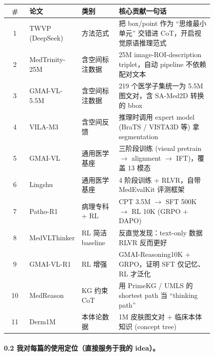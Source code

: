 \begin{center}
\renewcommand{\arraystretch}{1.3}
\setlength{\tabcolsep}{4pt}
\footnotesize
\begin{tabular}{|c|p{0.20\linewidth}|p{0.18\linewidth}|p{0.46\linewidth}|}
\hline
\# & 论文 & 类别 & 核心贡献一句话 \\
\hline
1 & TWVP (DeepSeek) & 方法范式 & 把 box/point 作为 ``思维最小单元'' 交错进 CoT，开启视觉原语推理范式 \\
\hline
2 & MedTrinity-25M & 含空间标注数据 & 25M image-ROI-description triplet，自动 pipeline 不依赖配对文本 \\
\hline
3 & GMAI-VL-5.5M & 含空间标注数据 & 219 个医学子集统一为 5.5M 图文对，含 SA-Med2D 转换的 bbox \\
\hline
4 & VILA-M3 & 含空间反馈 & 推理时调用 expert model (BraTS / VISTA3D 等) 拿 segmentation \\
\hline
5 & GMAI-VL & 通用医学基座 & 三阶段训练 (visual pretrain $\to$ alignment $\to$ IFT)，覆盖 13 模态 \\
\hline
6 & Lingshu & 通用医学基座 & 4 阶段训练 + RLVR，自带 MedEvalKit 评测框架 \\
\hline
7 & Patho-R1 & 病理专科 + RL & CPT 3.5M $\to$ SFT 500K $\to$ RL 10K (GRPO + DAPO) \\
\hline
8 & MedVLThinker & RL 简洁 baseline & 反直觉发现：text-only 数据 RLVR 反而更好 \\
\hline
9 & GMAI-VL-R1 & RL 增强 & GMAI-Reasoning10K + GRPO，证明 SFT 仅记忆、RL 才泛化 \\
\hline
10 & MedReason & KG 约束 CoT & 用 PrimeKG / UMLS 的 shortest path 当 ``thinking path'' \\
\hline
11 & Derm1M & 本体论数据 & 1M 皮肤图文对 + 临床本体知识 (concept tree) \\
\hline
\end{tabular}
\end{center}

\paragraph{0.2 我对每篇的使用定位（直接服务于我的 idea）。}

